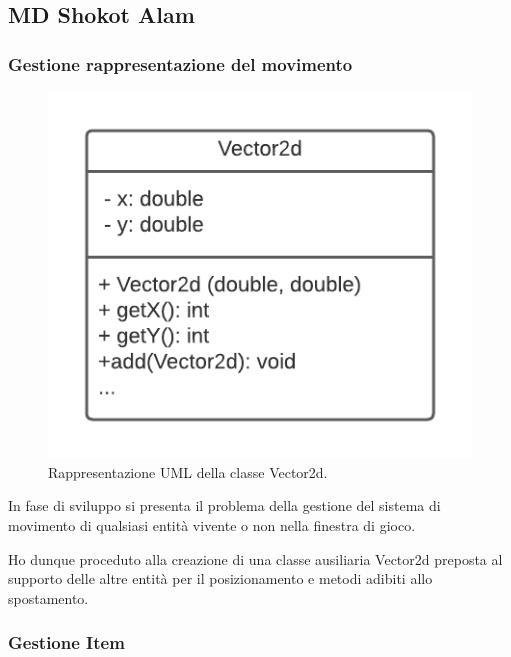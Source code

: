 \documentclass[a4paper,12pt]{report}
\begin{document}
    \subsection*{MD Shokot Alam}

    \subsubsection{Gestione rappresentazione del movimento}

    \begin{figure}[H]
        \centering{}
        \includegraphics[scale=0.75] {img/vector.png}
        \caption{Rappresentazione UML della classe Vector2d.}
        \label{img:vector}
    \end{figure}

    In fase di sviluppo si presenta  il problema della gestione del sistema di movimento di qualsiasi entità vivente o non nella finestra di gioco.

    Ho dunque proceduto alla creazione di una  classe ausiliaria Vector2d preposta  al supporto delle altre  entità per il posizionamento e metodi adibiti allo spostamento.

    \subsubsection{Gestione Item}
\end{document}
